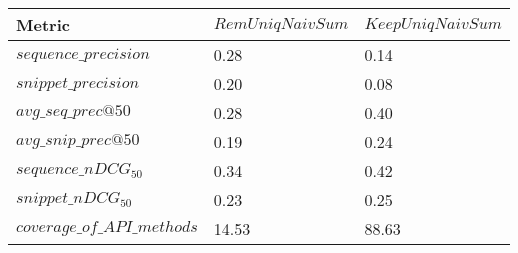 \begin{tabular}{lll}
\toprule
Metric & $RemUniqNaivSum$ & $KeepUniqNaivSum$ \\
\midrule
$sequence\_precision$ & 0.28 & 0.14 \\
$snippet\_precision$ & 0.20 & 0.08 \\
$avg\_seq\_prec@50$ & \color{red}0.28 & \color{red}0.40 \\
$avg\_snip\_prec@50$  & 0.19 & 0.24 \\
$sequence\_nDCG_{50}$ & \color{red}0.34 & \color{red}0.42 \\
$snippet\_nDCG_{50}$  & 0.23 & 0.25 \\
$coverage\_of\_API\_methods$ & \color{red}14.53 & \color{red}88.63 \\
\bottomrule
\end{tabular}